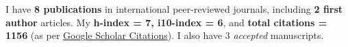 
I have \textbf{8 publications} in international peer-reviewed journals, including \textbf{2 first author} articles. My \textbf{h-index = 7, i10-index = 6}, and \textbf{total citations = 1156} (as per \href{https://scholar.google.com/citations?hl=en&user=6-7FYjIAAAAJ&authuser=2}{Google Scholar Citations}). I also have 3 \emph{accepted} manuscripts.

\nocite{*}


\printbibliography[heading={none},title={Journal Articles},type=article]



